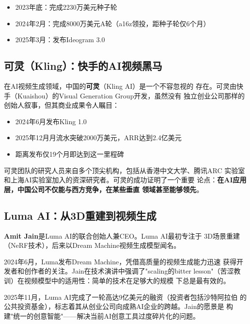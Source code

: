 \begin{itemize}
  \item 2023年底：完成2230万美元种子轮
  \item 2024年2月：完成8000万美元A轮（a16z领投，距种子轮仅6个月）
  \item 2025年3月：发布Ideogram 3.0
\end{itemize}

\subsection{可灵（Kling）：快手的AI视频黑马}
\label{subsec:founders-kling}

在AI视频生成领域，中国的\textbf{可灵}（Kling AI）是一个不容忽视的
存在。可灵由快手（Kuaishou）的Visual Generation Group开发，虽然没有
独立创业公司那样的创始人叙事，但其商业成果令人瞩目：

\begin{itemize}
  \item 2024年6月发布Kling 1.0
  \item 2025年12月月流水突破2000万美元，ARR达到2.4亿美元
  \item 距离发布仅19个月即达到这一里程碑
\end{itemize}

可灵团队的研究人员来自多个顶尖机构，包括从香港中文大学、腾讯ARC
实验室和上海AI实验室加入的资深研究者。可灵的成功证明了一个重要
论点：\textbf{在AI应用层，中国公司不仅能与西方竞争，在某些垂直
领域甚至能够领先}。

\subsection{Luma AI：从3D重建到视频生成}
\label{subsec:founders-luma}

\textbf{Amit Jain}是Luma AI的联合创始人兼CEO。Luma AI最初专注于
3D场景重建（NeRF技术），后来以Dream Machine视频生成模型闻名。

2024年6月，Luma发布Dream Machine，凭借高质量的视频生成能力迅速
获得开发者和创作者的关注。Jain在技术演讲中强调了"scaling的bitter
lesson"（苦涩教训）在视频模型中的适用性：简单的技术在足够大的规模
下总是最有效的。

2025年11月，Luma AI完成了一轮高达9亿美元的融资（投资者包括沙特阿拉伯
的公共投资基金），标志着其从创业公司向成熟AI企业的跨越。Jain的愿景是
构建"统一的创意智能"——解决当前AI创意工具过度碎片化的问题。


